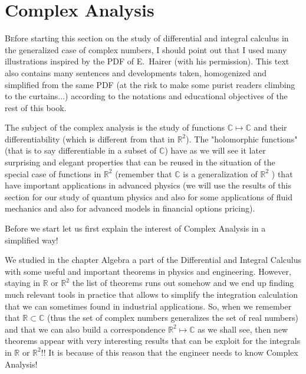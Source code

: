 	\newpage
	\thispagestyle{empty}
	\mbox{}
	\section{Complex Analysis}\label{complex analysis}

	\lettrine[lines=4]{\color{BrickRed}B}efore starting this section on the study of differential and integral calculus in the generalized case of complex numbers, I should point out that I used many illustrations inspired by the PDF of E.~Hairer (with his permission). This text also contains many sentences and developments taken, homogenized and simplified from the same PDF (at the risk to make some purist readers climbing to the curtains...) according to the notations and educational objectives of the rest of this book.

	The subject of the complex analysis is the study of functions $\mathbb{C} \mapsto \mathbb{C}$ and their differentiability (which is different from that in $\mathbb{R}^2$). The "holomorphic functions" (that is to say differentiable in a subset of $\mathbb{C}$) have as we will see it later surprising and elegant properties that can be reused in the situation of the special case of functions in $\mathbb{R}^2$ (remember that $\mathbb{C}$ is a generalization of $\mathbb{R}^2$ ) that have important applications in advanced physics (we will use the results of this section for our study of quantum physics and also for some applications of fluid mechanics and also for advanced models in financial options pricing).

	Before we start let us first explain the interest of Complex Analysis in a simplified way!

	We studied in the chapter Algebra a part of the Differential and Integral Calculus with some useful and important theorems in physics and engineering. However, staying in $\mathbb{R}$ or $\mathbb{R}^2$ the list of theorems runs out somehow and we end up finding much relevant tools in practice that allows to simplify the integration calculation that we can sometimes found in industrial applications. So, when we remember that $\mathbb{R} \subset \mathbb{C}$ (thus the set of complex numbers generalizes the set of real numbers) and that we can also build a correspondence $\mathbb{R}^2 \mapsto \mathbb{C}$ as we shall see, then new theorems appear with very interesting results that can be exploit for the integrals in $\mathbb{R}$ or $\mathbb{R}^2$!! It is because of this reason that the engineer needs to know Complex Analysis!
	
